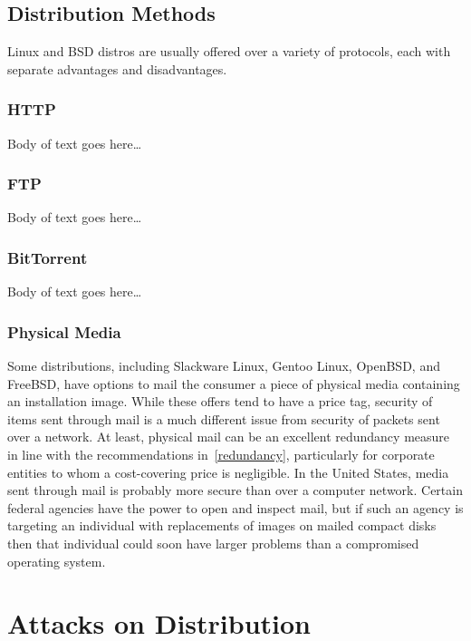 \documentclass[conference]{IEEEtran}
\begin{document}
\subsection{Distribution Methods}

Linux and BSD distros are usually offered over a variety of protocols,
each with separate advantages and disadvantages.

\subsubsection{HTTP}

Body of text goes here\ldots

\subsubsection{FTP}

Body of text goes here\ldots

\subsubsection{BitTorrent}

Body of text goes here\ldots

\subsubsection{Physical Media}

Some distributions, including Slackware Linux, Gentoo Linux, OpenBSD, and FreeBSD,
have options to mail the consumer a piece of physical media containing an installation
image. While these offers tend to have a price tag, security of items sent through mail
is a much different issue from security of packets sent over a network. At least, physical
mail can be an excellent redundancy measure in line with the recommendations
in~\ref{redundancy}, particularly for corporate entities to whom a cost-covering price is
negligible. In the United States, media sent through mail is probably more secure
than over a computer network. Certain federal agencies have the power to open and inspect
mail, but if such an agency is targeting an individual with replacements of images on
mailed compact disks then that individual could soon have larger problems than a
compromised operating system.

\section{Attacks on Distribution}
\end{document}
